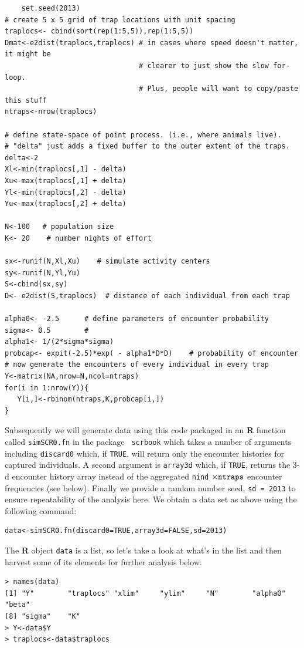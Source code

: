 {\small
\begin{verbatim}
	set.seed(2013)
# create 5 x 5 grid of trap locations with unit spacing
traplocs<- cbind(sort(rep(1:5,5)),rep(1:5,5))
Dmat<-e2dist(traplocs,traplocs) # in cases where speed doesn't matter, it might be
                                # clearer to just show the slow for-loop.
                                # Plus, people will want to copy/paste this stuff
ntraps<-nrow(traplocs)

# define state-space of point process. (i.e., where animals live).
# "delta" just adds a fixed buffer to the outer extent of the traps.
delta<-2
Xl<-min(traplocs[,1] - delta)
Xu<-max(traplocs[,1] + delta)
Yl<-min(traplocs[,2] - delta)
Yu<-max(traplocs[,2] + delta)

N<-100   # population size
K<- 20    # number nights of effort

sx<-runif(N,Xl,Xu)    # simulate activity centers
sy<-runif(N,Yl,Yu)
S<-cbind(sx,sy)
D<- e2dist(S,traplocs)  # distance of each individual from each trap

alpha0<- -2.5      # define parameters of encounter probability
sigma<- 0.5        #
alpha1<- 1/(2*sigma*sigma)
probcap<- expit(-2.5)*exp( - alpha1*D*D)    # probability of encounter
# now generate the encounters of every individual in every trap
Y<-matrix(NA,nrow=N,ncol=ntraps)
for(i in 1:nrow(Y)){
   Y[i,]<-rbinom(ntraps,K,probcap[i,])
}
\end{verbatim}
}


Subsequently we will generate data using this code packaged in an {\bf
  R}
function called \mbox{\tt simSCR0.fn} in the package \mbox{\tt
  scrbook} which takes a number of
arguments including \mbox{\tt discard0} which, if \mbox{\tt TRUE}, will return
only the encounter histories for captured individuals.  A second
argument is \mbox{\tt array3d} which, if \mbox{\tt TRUE}, returns the 3-d
encounter history array instead of the aggregated \mbox{\tt nind}
$\times \mbox{\tt ntraps}$ encounter frequencies (see below). Finally
we provide a random number seed, \mbox{\tt sd = 2013} to ensure
repeatability of the analysis here. We obtain a data set as above using the
following command:
\begin{verbatim}
data<-simSCR0.fn(discard0=TRUE,array3d=FALSE,sd=2013)
\end{verbatim}
The {\bf R} object \mbox{\tt data} is a list, so let's take a look at
what's in the list and then harvest some of its elements for further
analysis below.
{\small
\begin{verbatim}
> names(data)
[1] "Y"        "traplocs" "xlim"     "ylim"     "N"        "alpha0"   "beta"
[8] "sigma"    "K"
> Y<-data$Y
> traplocs<-data$traplocs
\end{verbatim}
}

